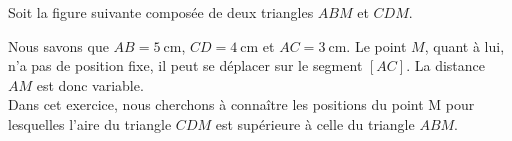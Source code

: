\documentclass[12pt,addpoints]{exam}
\begin{document}
\begin{questions}
\question[5] Soit la figure suivante composée de deux triangles $ABM$ et $CDM$.


Nous savons que $AB = \qty{5}{\cm}$, $CD= \qty{4}{\cm}$ et $AC = \qty{3}{\cm}$. Le point $M$, quant à lui, n'a pas de position fixe, il peut se déplacer sur le segment $[AC]$. La distance $AM$ est donc variable.\\
Dans cet exercice, nous cherchons à connaître les positions du point M pour lesquelles l'aire du triangle $CDM$ est supérieure à celle du triangle $ABM$.


\end{questions}
\end{document}
